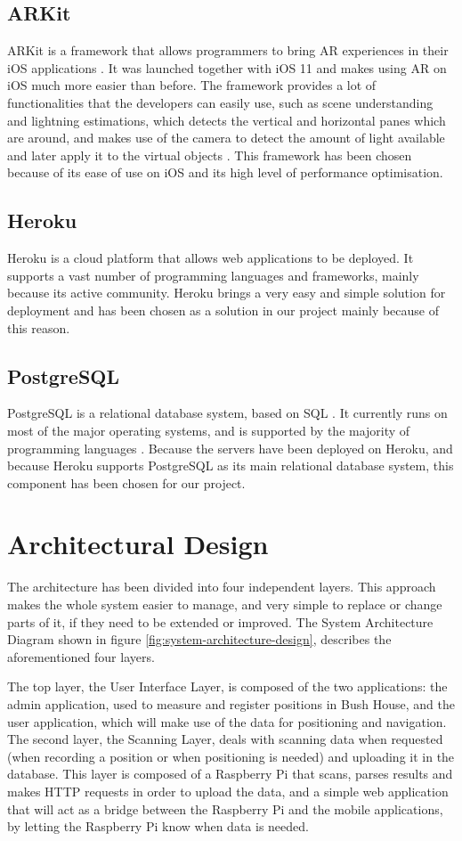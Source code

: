 \subsection{ARKit}
ARKit is a framework that allows programmers to bring AR experiences in their iOS applications \cite{arkit}. It was launched together with iOS 11 and makes using AR on iOS much more easier than before. The framework provides a lot of functionalities that the developers can easily use, such as scene understanding and lightning estimations, which detects the vertical and horizontal panes which are around, and makes use of the camera to detect the amount of light available and later apply it to the virtual objects \cite{arkit}. This framework has been chosen because of its ease of use on iOS and its high level of performance optimisation.

\subsection{Heroku}
Heroku is a cloud platform that allows web applications to be deployed. It supports a vast number of programming languages and frameworks, mainly because its active community. Heroku brings a very easy and simple solution for deployment and has been chosen as a solution in our project mainly because of this reason.

\subsection{PostgreSQL}
PostgreSQL is a relational database system, based on SQL \cite{postgresql}. It currently runs on most of the major operating systems, and is supported by the majority of programming languages \cite{postgresql}. Because the servers have been deployed on Heroku, and because Heroku supports PostgreSQL as its main relational database system, this component has been chosen for our project.

\newpage
\section{Architectural Design}
The architecture has been divided into four independent layers. This approach makes the whole system easier to manage, and very simple to replace or change parts of it, if they need to be extended or improved. The System Architecture Diagram shown in figure \ref{fig:system-architecture-design}, describes the aforementioned four layers. 

The top layer, the User Interface Layer, is composed of the two applications: the admin application, used to measure and register positions in Bush House, and the user application, which will make use of the data for positioning and navigation. 
The second layer, the Scanning Layer, deals with scanning data when requested (when recording a position or when positioning is needed) and uploading it in the database. This layer is composed of a Raspberry Pi that scans, parses results and makes HTTP requests in order to upload the data, and a simple web application that will act as a bridge between the Raspberry Pi and the mobile applications, by letting the Raspberry Pi know when data is needed.

